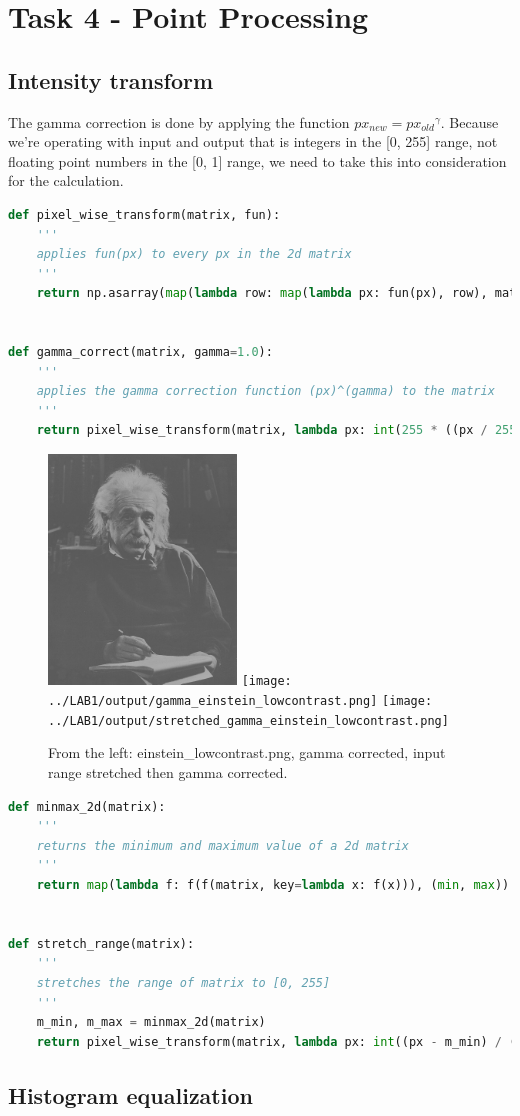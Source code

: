 \clearpage
\section*{Task 4 - Point Processing}

\subsection*{Intensity transform}

The gamma correction is done by applying the function $px_{new} = {px_{old}}^{\gamma}$.
Because we're operating with input and output that is integers in the [0, 255] range, not floating point numbers in the [0, 1] range, we need to take this into consideration for the calculation.
\begin{lstlisting}[language=Python, label=gamma_correction, caption=Gamma correction]
def pixel_wise_transform(matrix, fun):
    '''
    applies fun(px) to every px in the 2d matrix
    '''
    return np.asarray(map(lambda row: map(lambda px: fun(px), row), matrix))


def gamma_correct(matrix, gamma=1.0):
    '''
    applies the gamma correction function (px)^(gamma) to the matrix
    '''
    return pixel_wise_transform(matrix, lambda px: int(255 * ((px / 255) ** gamma)))
\end{lstlisting}

\begin{figure}[h!]
    \centering
    \includegraphics[width=5cm]{../LAB1/img/einstein_lowcontrast.png}
    \texttt{[image: ../LAB1/output/gamma\_einstein\_lowcontrast.png]}
    \texttt{[image: ../LAB1/output/stretched\_gamma\_einstein\_lowcontrast.png]}
    \caption{From the left: einstein\_lowcontrast.png, gamma corrected, input range stretched then gamma corrected.}
\end{figure}


\begin{lstlisting}[language=Python, label=input_range, caption=Input range stretching]
def minmax_2d(matrix):
    '''
    returns the minimum and maximum value of a 2d matrix
    '''
    return map(lambda f: f(f(matrix, key=lambda x: f(x))), (min, max))


def stretch_range(matrix):
    '''
    stretches the range of matrix to [0, 255]
    '''
    m_min, m_max = minmax_2d(matrix)
    return pixel_wise_transform(matrix, lambda px: int((px - m_min) / ((m_max - m_min) / 255)))
\end{lstlisting}

\subsection*{Histogram equalization}
